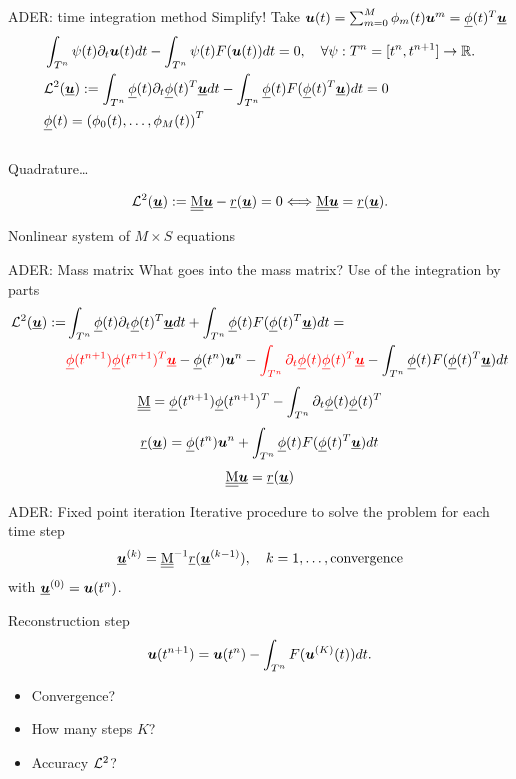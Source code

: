 \documentclass[aspectratio=169]{beamer}
\begin{document}
\begin{frame}{ADER: time integration method}
Simplify!  Take $\bc(t) = \sum_{m=0}^M \phi_m(t) \bc^m = \bphi(t)^T\bbc$
\begin{align*}\label{eq:ADERODEL2}
&\int_{T^n}  \psi(t)\partial_t \bc(t) dt - \int_{T^n} \psi(t)F(\bc(t))  dt = 0, \quad  \forall \psi: T^n=[t^n,t^{n+1}]\to \R.
\\
&\L^2(\bbc ):= \int_{T^n} \bphi(t) \partial_t \bphi(t)^T \bbc dt - \int_{T^n} \bphi(t)  F(\bphi(t)^T\bbc)  dt = 0\\
&\bphi(t) = \left( \phi_0(t), \dots, \phi_M(t) \right)^T
\end{align*}\\

Quadrature\dots

\begin{equation}\label{fix:point}
\L^2(\bbc):=\M\bbc-\vec{r}(\bbc)=0 \Longleftrightarrow  \M \bbc = \vec{r}(\bbc)  .
\end{equation}

Nonlinear system of $M \times S$ equations


\end{frame}
\begin{frame}{ADER: Mass matrix}
	What goes into the mass matrix? Use of the integration by parts
	\begin{align*}
		\L^2(\bbc ):=& \int_{T^n} \bphi(t) \partial_t \bphi(t)^T \bbc dt + \int_{T^n} \bphi(t)  F(\bphi(t)^T\bbc)  dt =\\
		&{\color{red}\bphi(t^{n+1}) \bphi(t^{n+1})^T \bbc} - \bphi(t^{n}) \bc^n -  {\color{red}\int_{T^n} \partial_t \bphi(t) \bphi(t)^T \bbc }  - \int_{T^n} \bphi(t)  F(\bphi(t)^T\bbc)  dt 
	\end{align*}
	$$
	\M = \bphi(t^{n+1}) \bphi(t^{n+1})^T -\int_{T^n} \partial_t \bphi(t) \bphi(t)^T 
	$$
	$$
	\vec{r}(\bbc) =  \bphi(t^{n}) \bc^n + \int_{T^n} \bphi(t)  F(\bphi(t)^T\bbc)  dt 
	$$
$$
\M \bbc = \vec{r}(\bbc)
$$
\end{frame}


\begin{frame}{ADER: Fixed point iteration}
Iterative procedure to solve the problem for each time step
\begin{equation}\label{fix:point}
\bbc^{(k)}=\M^{-1}\vec{r}(\bbc^{(k-1)}),\quad k=1,\dots, \text{convergence}
\end{equation}
with $\bbc^{(0)}=\bc(t^n)$.

Reconstruction step
\begin{equation*}
	\bc(t^{n+1}) = \bc(t^{n}) - \int_{T^n} F(\bc^{(K)}(t))  dt.
\end{equation*}
\begin{itemize}
\item Convergence?
\item How many steps $K$?
\item Accuracy $\L^2$?
\end{itemize}

\end{frame}
\end{document}
